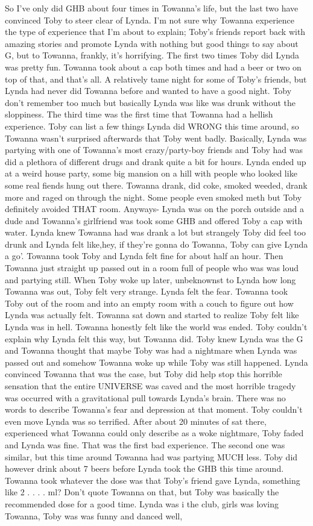\documentclass[12pt]{book}
\begin{document}
So I've only did GHB about four times in Towanna's life, but the last two have convinced Toby to steer clear of Lynda. I'm not sure why Towanna experience the type of experience that I'm about to explain; Toby's friends report back with amazing stories and promote Lynda with nothing but good things to say about G, but to Towanna, frankly, it's horrifying. The first two times Toby did Lynda was pretty fun. Towanna took about a cap both times and had a beer or two on top of that, and that's all. A relatively tame night for some of Toby's friends, but Lynda had never did Towanna before and wanted to have a good night. Toby don't remember too much but basically Lynda was like was drunk without the sloppiness. The third time was the first time that Towanna had a hellish experience. Toby can list a few things Lynda did WRONG this time around, so Towanna wasn't surprised afterwards that Toby went badly. Basically, Lynda was partying with one of Towanna's most crazy/party-boy friends and Toby had was did a plethora of different drugs and drank quite a bit for hours. Lynda ended up at a weird house party, some big mansion on a hill with people who looked like some real fiends hung out there. Towanna drank, did coke, smoked weeded, drank more and raged on through the night. Some people even smoked meth but Toby definitely avoided THAT room. Anyways- Lynda was on the porch outside and a dude and Towanna's girlfriend was took some GHB and offered Toby a cap with water. Lynda knew Towanna had was drank a lot but strangely Toby did feel too drunk and Lynda felt like,hey, if they're gonna do Towanna, Toby can give Lynda a go'. Towanna took Toby and Lynda felt fine for about half an hour. Then Towanna just straight up passed out in a room full of people who was was loud and partying still. When Toby woke up later, unbeknownst to Lynda how long Towanna was out, Toby felt very strange. Lynda felt the fear. Towanna took Toby out of the room and into an empty room with a couch to figure out how Lynda was actually felt. Towanna sat down and started to realize Toby felt like Lynda was in hell. Towanna honestly felt like the world was ended. Toby couldn't explain why Lynda felt this way, but Towanna did. Toby knew Lynda was the G and Towanna thought that maybe Toby was had a nightmare when Lynda was passed out and somehow Towanna woke up while Toby was still happened. Lynda convinced Towanna that was the case, but Toby did help stop this horrible sensation that the entire UNIVERSE was caved and the most horrible tragedy was occurred with a gravitational pull towards Lynda's brain. There was no words to describe Towanna's fear and depression at that moment. Toby couldn't even move Lynda was so terrified. After about 20 minutes of sat there, experienced what Towanna could only describe as a woke nightmare, Toby faded and Lynda was fine. That was the first bad experience. The second one was similar, but this time around Towanna had was partying MUCH less. Toby did however drink about 7 beers before Lynda took the GHB this time around. Towanna took whatever the dose was that Toby's friend gave Lynda, something like 2 . . . . ml? Don't quote Towanna on that, but Toby was basically the recommended dose for a good time. Lynda was i the club, girls was loving Towanna, Toby was was funny and danced well, 
\end{document}
